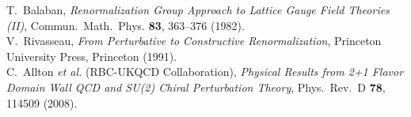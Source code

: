 \begin{thebibliography}{99}
	T.~Balaban,
	\textit{Renormalization Group Approach to Lattice Gauge Field Theories (II)},
	Commun.~Math.~Phys. \textbf{83}, 363--376 (1982).
	\\[-0.75em]
	
	V.~Rivasseau,
	\textit{From Perturbative to Constructive Renormalization},
	Princeton University Press, Princeton (1991).
	\\[-0.75em]
	
	C.~Allton \textit{et al.} (RBC-UKQCD Collaboration),
	\textit{Physical Results from 2+1 Flavor Domain Wall QCD and SU(2) Chiral Perturbation Theory},
	Phys.~Rev.~D \textbf{78}, 114509 (2008).
	\\[-0.75em]
	
\end{thebibliography}

